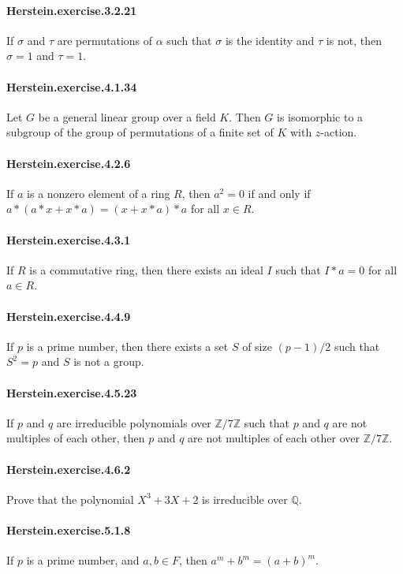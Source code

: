 \documentclass{article}
\begin{document}
\paragraph{Herstein.exercise.3.2.21} If $σ$ and $τ$ are permutations of $α$ such that $σ$ is the identity and $τ$ is not, then $σ = 1$ and $τ = 1$. 

\paragraph{Herstein.exercise.4.1.34} Let $G$ be a general linear group over a field $K$. Then $G$ is isomorphic to a subgroup of the group of permutations of a finite set of $K$ with $z$-action.

\paragraph{Herstein.exercise.4.2.6} If $a$ is a nonzero element of a ring $R$, then $a^2 = 0$ if and only if $a * (a * x + x * a) = (x + x * a) * a$ for all $x \in R$.

\paragraph{Herstein.exercise.4.3.1} If $R$ is a commutative ring, then there exists an ideal $I$ such that $I*a=0$ for all $a \in R$.

\paragraph{Herstein.exercise.4.4.9} If $p$ is a prime number, then there exists a set $S$ of size $(p-1)/2$ such that $S^2 = p$ and $S$ is not a group.

\paragraph{Herstein.exercise.4.5.23} If $p$ and $q$ are irreducible polynomials over $\mathbb{Z}/7\mathbb{Z}$ such that $p$ and $q$ are not multiples of each other, then $p$ and $q$ are not multiples of each other over $\mathbb{Z}/7\mathbb{Z}$.

\paragraph{Herstein.exercise.4.6.2} Prove that the polynomial $X^3 + 3X + 2$ is irreducible over $\mathbb{Q}$.

\paragraph{Herstein.exercise.5.1.8} If $p$ is a prime number, and $a, b \in F$, then $a^m + b^m = (a + b)^m$.
\end{document}
